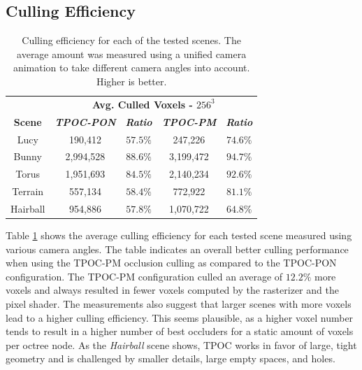 \documentclass[conference]{IEEEtran}
\begin{document}
\subsection{Culling Efficiency} \label{subsec-culling-efficiency}

\begin{table}[htbp]
    \caption{Culling efficiency for each of the tested scenes. The average amount was measured using a 
    unified camera animation to take different camera angles into account. Higher is better.}
    \begin{center}
        \begin{tabular}{|c|cc|cc|}
            \hline
            \textbf{}&\multicolumn{4}{|c|}{\textbf{Avg. Culled Voxels - $256^3$}} \\
            \cline{2-5} 
            \textbf{Scene} & \textbf{\textit{\ac{TPOC-PON}}} & \textbf{\textit{Ratio}} & \textbf{\textit{\ac{TPOC-PM}}} & \textbf{\textit{Ratio}} \\
            \hline
            Lucy        &  190,412      & $57.5 \%$    & 247,226        & $74.6 \%$     \\
            Bunny       &  2,994,528    & $88.6 \%$    & 3,199,472      & $94.7 \%$     \\
            Torus       &  1,951,693    & $84.5 \%$    & 2,140,234      & $92.6 \%$     \\
            Terrain     &  557,134      & $58.4 \%$    & 772,922        & $81.1 \%$     \\
            Hairball    &  954,886      & $57.8 \%$    & 1,070,722      & $64.8 \%$     \\
            \hline
        \end{tabular}
    \label{tab:culling-efficiency}
    \end{center}
\end{table}

\noindent
Table \ref{tab:culling-efficiency} shows the average culling efficiency for each tested scene measured using 
various camera angles. The table indicates an overall better culling performance when using the \ac{TPOC-PM} 
occlusion culling as compared to the \ac{TPOC-PON} configuration. The \ac{TPOC-PM} configuration culled 
an average of $12.2 \%$ more voxels and always resulted in fewer voxels computed by the rasterizer and the 
pixel shader. The measurements also suggest that larger scenes with more voxels lead to a higher culling 
efficiency. This seems plausible, as a higher voxel number tends to result in a higher number of best occluders 
for a static amount of voxels per octree node. As the \emph{Hairball} scene shows, \ac{TPOC} works in favor 
of large, tight geometry and is challenged by smaller details, large empty spaces, and holes.
\end{document}
